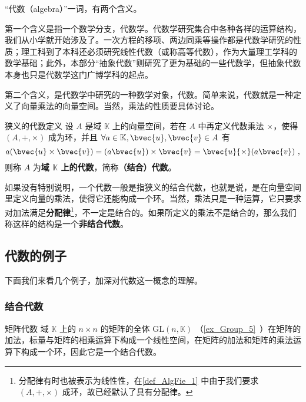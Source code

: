 

“代数（algebra）”一词，有两个含义。

第一个含义是指一个数学分支，代数学。代数学研究集合中各种各样的运算结构，我们从小学就开始涉及了。一次方程的移项、两边同乘等操作都是代数学研究的性质；理工科到了本科还必须研究线性代数（或称高等代数），作为大量理工学科的数学基础；此外，本部分“抽象代数”则研究了更为基础的一些代数学，但抽象代数本身也只是代数学这门广博学科的起点。

第二个含义，是代数学中研究的一种数学对象，代数。简单来说，代数就是一种定义了向量乘法的向量空间。当然，乘法的性质要具体讨论。



\begin{definition}{狭义的代数定义}\label{def_AlgFie_1}
设 $A$ 是域 $\mathbb{K}$ 上的向量空间，若在 $A$ 中再定义代数乘法 $\times$，使得 $(A,+,\times)$ 成为环，并且 $\forall a\in \mathbb{K}, \bvec{u}, \bvec{v}\in A$ 有
\begin{equation}
a(\bvec{u} \times \bvec{v})=(a \bvec{u}) \times \bvec{v}=\bvec{u}{\times}(a \bvec{v})~,
\end{equation}
则称 $A$ 为\textbf{域 $\mathbb{K}$ 上的代数}，简称\textbf{（结合）代数}。

\end{definition}

如果没有特别说明，一个代数一般是指狭义的结合代数，也就是说，是在向量空间里定义向量的乘法，使得它还能构成一个环。当然，乘法只是一种运算，它只要求对加法满足\textbf{分配律}\footnote{分配律有时也被表示为线性性，在\autoref{def_AlgFie_1} 中由于我们要求 $(A, +, \times)$ 成环，故已经默认了具有分配律。}，不一定是结合的。如果所定义的乘法不是结合的，那么我们称这样的结构是一个\textbf{非结合代数}。


\subsection{代数的例子}
下面我们来看几个例子，加深对代数这一概念的理解。

\subsubsection{结合代数}

\begin{example}{矩阵代数}
域 $\mathbb{K}$ 上的 $n\times n$ 的矩阵的全体 $\mathrm{GL}(n, \mathbb{K})$ （\autoref{ex_Group_5}~）在矩阵的加法，标量与矩阵的相乘运算下构成一个线性空间，在矩阵的加法和矩阵的乘法运算下构成一个环，因此它是一个结合代数。
\end{example}

